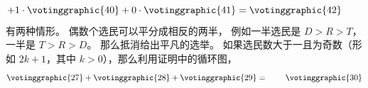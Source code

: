 \begin{exercises}
\begin{answer}
\begin{exparts}
\begin{equation*}
            +1\cdot\votinggraphic{40}
            +0\cdot\votinggraphic{41}
            =\votinggraphic{42}
          \tag*{}\end{equation*}
        \partsitem 有两种情形。
          偶数个选民可以平分成相反的两半，
          例如一半选民是 $D>R>T$，一半是 $T>R>D$。
          那么抵消给出平凡的选举。
          如果选民数大于一且为奇数（形如
          $2k+1$，其中 $k>0$），那么利用证明中的循环图，
          \begin{equation*}
            \votinggraphic{27}  %
            +  
            \votinggraphic{28}  %
            +  
            \votinggraphic{29}  %
            =\hspace{.30in}
            \votinggraphic{30}  %

\end{equation*}
\end{exparts}
\end{answer}
\end{exercises}
